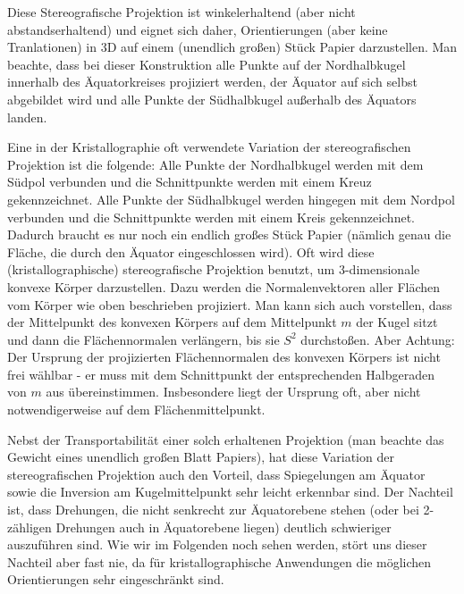  Diese Stereografische Projektion ist winkelerhaltend (aber nicht abstandserhaltend) und eignet sich daher, Orientierungen  (aber keine Tranlationen) in 3D auf einem (unendlich großen) Stück Papier darzustellen. Man beachte, dass bei dieser Konstruktion alle Punkte auf der Nordhalbkugel innerhalb des Äquatorkreises projiziert werden, der Äquator auf sich selbst abgebildet wird und alle Punkte der Südhalbkugel außerhalb des Äquators landen. 

Eine in der Kristallographie oft verwendete Variation der stereografischen Projektion ist die folgende: Alle Punkte der Nordhalbkugel werden mit dem Südpol verbunden und die Schnittpunkte werden mit einem Kreuz gekennzeichnet. Alle Punkte der Südhalbkugel werden hingegen mit dem Nordpol verbunden und die Schnittpunkte werden mit einem Kreis gekennzeichnet. Dadurch braucht es nur noch ein endlich großes Stück Papier (nämlich genau die Fläche, die durch den Äquator eingeschlossen wird).
Oft wird diese (kristallographische) stereografische Projektion benutzt, um 3-dimensionale konvexe Körper darzustellen. Dazu werden die Normalenvektoren aller Flächen vom Körper wie oben beschrieben projiziert. Man kann sich auch vorstellen, dass der Mittelpunkt des konvexen Körpers auf dem Mittelpunkt $m$ der Kugel sitzt und dann die Flächennormalen verlängern, bis sie $S^2$ durchstoßen. Aber Achtung: Der Ursprung der projizierten Flächennormalen des konvexen Körpers ist nicht frei wählbar - er muss mit dem Schnittpunkt der entsprechenden Halbgeraden von $m$ aus übereinstimmen. Insbesondere liegt der Ursprung oft, aber nicht notwendigerweise auf dem Flächenmittelpunkt.
 
Nebst der Transportabilität einer solch erhaltenen Projektion (man beachte das Gewicht eines unendlich großen Blatt Papiers), hat diese Variation der stereografischen Projektion auch den Vorteil, dass Spiegelungen am Äquator sowie die Inversion am Kugelmittelpunkt sehr leicht erkennbar sind. Der Nachteil ist, dass Drehungen, die nicht senkrecht zur Äquatorebene stehen (oder bei 2-zähligen Drehungen  auch in Äquatorebene liegen) deutlich schwieriger auszuführen sind. Wie wir im Folgenden noch sehen werden, stört uns dieser Nachteil aber fast nie, da für kristallographische Anwendungen die möglichen Orientierungen sehr eingeschränkt sind.
